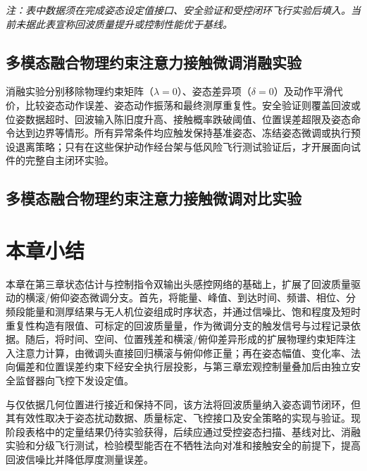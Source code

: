 \textit{注：表中数据须在完成姿态设定值接口、安全验证和受控闭环飞行实验后填入。当前未据此表宣称回波质量提升或控制性能优于基线。}

\subsection{多模态融合物理约束注意力接触微调消融实验}

消融实验分别移除物理约束矩阵（$\lambda=0$）、姿态差异项（$\delta=0$）及动作平滑代价，比较姿态动作误差、姿态动作振荡和最终测厚重复性。安全验证则覆盖回波或位姿数据超时、回波输入陈旧度升高、接触概率跌破阈值、位置误差超限及姿态命令达到边界等情形。所有异常条件均应触发保持基准姿态、冻结姿态微调或执行预设退离策略；只有在这些保护动作经台架与低风险飞行测试验证后，才开展面向试件的完整自主闭环实验。

\subsection{多模态融合物理约束注意力接触微调对比实验}

\section{本章小结}

本章在第三章状态估计与控制指令双输出头感控网络的基础上，扩展了回波质量驱动的横滚/俯仰姿态微调分支。首先，将能量、峰值、到达时间、频谱、相位、分频段能量和测厚结果与无人机位姿组成时序状态，并通过信噪比、饱和程度及短时重复性构造有限值、可标定的回波质量量，作为微调分支的触发信号与过程记录依据。随后，将时间、空间、位置残差和横滚/俯仰差异形成的扩展物理约束矩阵注入注意力计算，由微调头直接回归横滚与俯仰修正量；再在姿态幅值、变化率、法向偏差和位置误差约束下经安全执行层投影，与第三章宏观控制量叠加后由独立安全监督器向飞控下发设定值。

与仅依据几何位置进行接近和保持不同，该方法将回波质量纳入姿态调节闭环，但其有效性取决于姿态扰动数据、质量标定、飞控接口及安全策略的实现与验证。现阶段表格中的定量结果仍待实验获得，后续应通过受控姿态扫描、基线对比、消融实验和分级飞行测试，检验模型能否在不牺牲法向对准和接触安全的前提下，提高回波信噪比并降低厚度测量误差。
